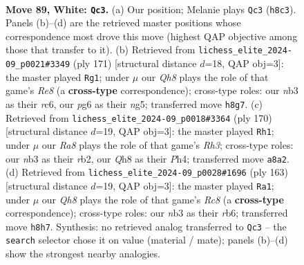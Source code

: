 \documentclass[11pt]{article}
\begin{document}
\clearpage

\begin{figure}[p]\centering
\begin{subfigure}{0.46\textwidth}\centering
\resizebox{\linewidth}{!}{%
\newchessgame
\chessboard[
  setfen={R6Q/8/6p1/3k1p2/5P2/1n6/6K1/8 w - - 1 89},
  showmover=false,
  pgfstyle=straightmove, color=movearrow, markmove={h8-c3}
]}
\caption{}
\end{subfigure}\hfill
\begin{subfigure}{0.46\textwidth}\centering
\resizebox{\linewidth}{!}{%
\newchessgame
\chessboard[
  setfen={8/4k3/2R5/5pN1/8/3K2P1/8/4r3 b - - 0 86},
  showmover=false,
  pgfstyle=straightmove, color=movearrow, markmove={e1-g1}
]}
\caption{}
\end{subfigure}
\\[4pt]
\begin{subfigure}{0.46\textwidth}\centering
\resizebox{\linewidth}{!}{%
\newchessgame
\chessboard[
  setfen={8/7k/6p1/7p/7P/7R/1r6/5K2 w - - 32 86},
  showmover=false,
  pgfstyle=straightmove, color=movearrow, markmove={h3-h1}
]}
\caption{}
\end{subfigure}\hfill
\begin{subfigure}{0.46\textwidth}\centering
\resizebox{\linewidth}{!}{%
\newchessgame
\chessboard[
  setfen={8/5k2/1R6/7p/7P/6P1/7K/2r5 b - - 41 82},
  showmover=false,
  pgfstyle=straightmove, color=movearrow, markmove={c1-a1}
]}
\caption{}
\end{subfigure}
\caption{\textbf{Move 89, White: \texttt{Qc3}.} (a) Our position; Melanie plays \texttt{Qc3} (\texttt{h8c3}). Panels (b)--(d) are the retrieved master positions whose correspondence most drove this move (highest QAP objective among those that transfer to it). (b) Retrieved from \texttt{lichess\_elite\_2024-09\_p0021\#3349} (ply 171) [structural distance $d$=18, QAP obj=3]: the master played \texttt{Rg1}; under $\mu$ our \emph{Qh8} plays the role of that game's \emph{Re8} (a \textbf{cross-type} correspondence); cross-type roles: our \emph{n}b3 as their \emph{r}c6, our \emph{p}g6 as their \emph{n}g5; transferred move \texttt{h8g7}. (c) Retrieved from \texttt{lichess\_elite\_2024-09\_p0018\#3364} (ply 170) [structural distance $d$=19, QAP obj=3]: the master played \texttt{Rh1}; under $\mu$ our \emph{Ra8} plays the role of that game's \emph{Rh3}; cross-type roles: our \emph{n}b3 as their \emph{r}b2, our \emph{Q}h8 as their \emph{P}h4; transferred move \texttt{a8a2}. (d) Retrieved from \texttt{lichess\_elite\_2024-09\_p0028\#1696} (ply 163) [structural distance $d$=19, QAP obj=3]: the master played \texttt{Ra1}; under $\mu$ our \emph{Qh8} plays the role of that game's \emph{Rc8} (a \textbf{cross-type} correspondence); cross-type roles: our \emph{n}b3 as their \emph{r}b6; transferred move \texttt{h8h7}. Synthesis: no retrieved analog transferred to \texttt{Qc3} -- the \texttt{search} selector chose it on value (material / mate); panels (b)--(d) show the strongest nearby analogies.}
\label{fig:thought-m176}
\end{figure}
\end{document}

